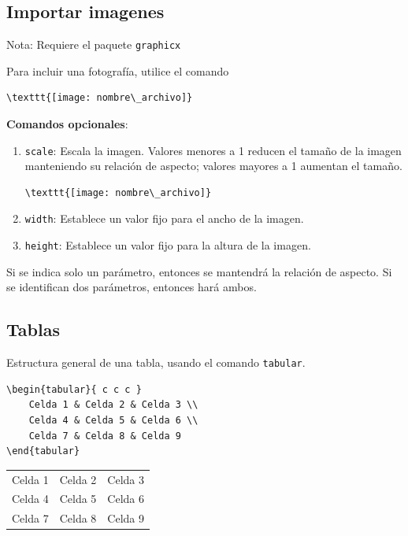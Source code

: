 \documentclass[../notes.tex]{subfiles}
\begin{document}
    \subsection{Importar imagenes}
        Nota: Requiere el paquete \texttt{graphicx}

        Para incluir una fotografía, utilice el comando 
        \begin{verbatim}
\texttt{[image: nombre\_archivo]}
        \end{verbatim}
        \textbf{Comandos opcionales}:
            \begin{enumerate}
                \item \texttt{scale}: Escala la imagen. Valores menores a 1 reducen el tamaño de la imagen manteniendo su relación de aspecto; valores mayores a 1 aumentan el tamaño.
        \begin{verbatim}
\texttt{[image: nombre\_archivo]}
        \end{verbatim}
                \item \texttt{width}: Establece un valor fijo para el ancho de la imagen.
                \item \texttt{height}: Establece un valor fijo para la altura de la imagen.
            \end{enumerate}
        Si se indica solo un parámetro, entonces se mantendrá la relación de aspecto. Si se identifican dos parámetros, entonces hará ambos.

    \subsection{Tablas}
    
        Estructura general de una tabla, usando el comando \texttt{tabular}.
        
            \begin{verbatim}
\begin{tabular}{ c c c }
    Celda 1 & Celda 2 & Celda 3 \\ 
    Celda 4 & Celda 5 & Celda 6 \\  
    Celda 7 & Celda 8 & Celda 9    
\end{tabular}
            \end{verbatim}
            
\begin{tabular}{ c c c }
    Celda 1 & Celda 2 & Celda 3 \\ 
    Celda 4 & Celda 5 & Celda 6 \\  
    Celda 7 & Celda 8 & Celda 9    
\end{tabular}\\[\baselineskip]
\end{document}
